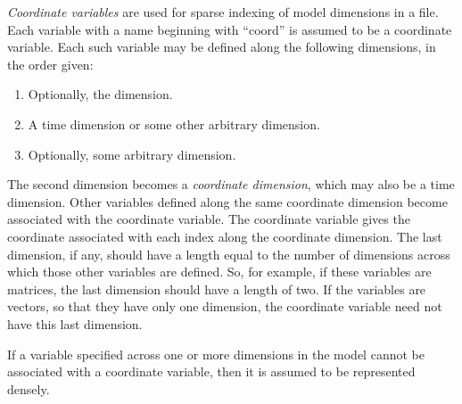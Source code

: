 \emph{Coordinate variables} are used for sparse indexing of model dimensions
in a file. Each variable with a name beginning with ``coord'' is assumed to be
a coordinate variable. Each such variable may be defined along the following
dimensions, in the order given:
\begin{enumerate}
\item Optionally, the  dimension.
\item A time dimension or some other arbitrary dimension.
\item Optionally, some arbitrary dimension.
\end{enumerate}
The second dimension becomes a \emph{coordinate dimension}, which may also be a time dimension. Other variables defined
along the same coordinate dimension become associated with the coordinate
variable. The coordinate variable gives the coordinate associated with each
index along the coordinate dimension. The last dimension, if any, should have
a length equal to the number of dimensions across which those other variables
are defined. So, for example, if these variables are matrices, the last
dimension should have a length of two. If the variables are vectors, so that
they have only one dimension, the coordinate variable need not have this last
dimension.


If a variable specified across one or more dimensions in the model cannot be
associated with a coordinate variable, then it is assumed to be represented
densely.

